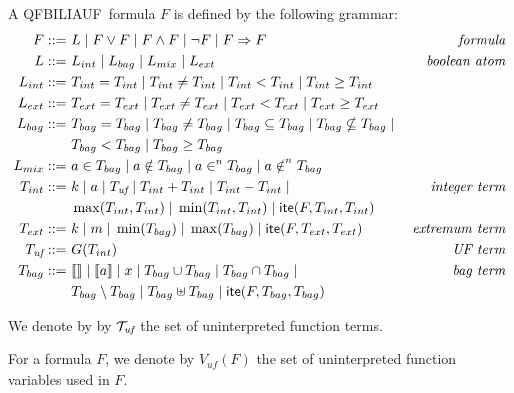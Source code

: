 \begin{mydef}
A QFBILIAUF\ formula $F$ is defined by the following grammar:
\begin{align*}
F ::= &\ L \; | \; F\lor F \; | \; F\land F \; | \; \lnot F \; | \; F\Rightarrow F
& \textit{formula}
\\
L ::= &\ L_{int} \; |\; L_{bag} \; |\; L_{mix} \; |\; L_{ext}
& \textit{boolean atom}
\\
L_{int} ::= &\ T_{int} = T_{int} \; |\; T_{int} \neq T_{int} \; |\; T_{int} < T_{int}\; |\;  T_{int} \ge T_{int}
\\
L_{ext} ::= &\ T_{ext} = T_{ext} \; |\; T_{ext} \neq T_{ext} \; |\; T_{ext} < T_{ext}\; |\;  T_{ext} \ge T_{ext}
\\
L_{bag} ::= &\ T_{bag} = T_{bag} \; |\;T_{bag} \neq T_{bag} \; |\;
T_{bag} \subseteq T_{bag} \; |\;T_{bag} \nsubseteq T_{bag} \; | \;
\\
&\ T_{bag} < T_{bag} \; |\;T_{bag} \ge T_{bag}
\\
L_{mix} ::= &\ a \in T_{bag}\; |\;a \notin T_{bag}\; |\;a \in^{n} T_{bag}\; |\;a \notin^{n} T_{bag}
\\
T_{int} ::= &\  k \;|\; a \;|\; T_{\textit{uf}} \;|\;  T_{int} + T_{int} \;|\; T_{int} - T_{int}\;|\;
& \textit{integer term}
\\
&\ \max(T_{int},T_{int})\;|\; \min(T_{int},T_{int}) \;|\; \textsf{ite}(F,T_{int},T_{int})
\\
T_{ext} ::= &\ k \;|\; m \;|\; \min(T_{bag}) \;|\; \max(T_{bag}) \;|\; \textsf{ite}(F,T_{ext},T_{ext})
& \textit{extremum term}
\\
T_{\textit{uf}} ::= &\ G(T_{int})
&\textit{UF term}
\\
T_{bag} ::= &\ \llbracket  \rrbracket\;|\;\llbracket a \rrbracket \;|\;x \;|\; T_{bag} \cup T_{bag} \;|\; T_{bag} \cap T_{bag} \;|\;
& \textit{bag term}
\\
&\ T_{bag} \setminus T_{bag}\;|\; T_{bag} \uplus T_{bag} \;|\; \textsf{ite}(F,T_{bag},T_{bag})
\\
\end{align*}

We denote by by $\mathcal{T}_{\textit{uf}}$ the set of uninterpreted function terms.
\end{mydef}

For a formula $F$, we denote by $V_{\textit{uf}}(F)$ the set of uninterpreted function variables used in $F$.
